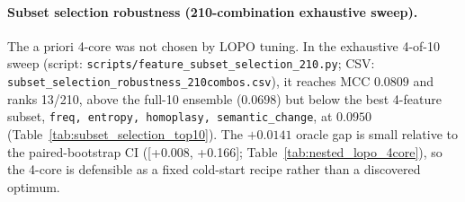 \paragraph{Subset selection robustness (210-combination exhaustive sweep).}
\label{para:subset_selection_robustness}
The a priori 4-core was not chosen by LOPO tuning. In the exhaustive 4-of-10 sweep (script: \texttt{scripts/feature\_subset\_selection\_210.py}; CSV: \texttt{subset\_selection\_robustness\_210combos.csv}), it reaches MCC $0.0809$ and ranks 13/210, above the full-10 ensemble ($0.0698$) but below the best 4-feature subset, \texttt{freq, entropy, homoplasy, semantic\_change}, at $0.0950$ (Table~\ref{tab:subset_selection_top10}). The $+0.0141$ oracle gap is small relative to the paired-bootstrap CI ([+0.008, +0.166]; Table~\ref{tab:nested_lopo_4core}), so the 4-core is defensible as a fixed cold-start recipe rather than a discovered optimum.

